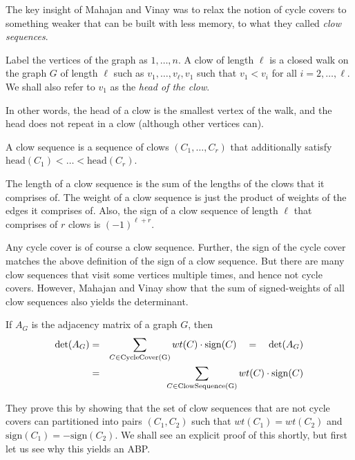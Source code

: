 The key insight of Mahajan and Vinay was to relax the notion of cycle covers to something weaker that can be built with less memory, to what they called \emph{clow sequences}. 

\begin{definition}
Label the vertices of the graph as $1,\dots, n$. A clow  of length $\ell$ is a closed walk on the graph $G$ of length $\ell$ such as $v_1,\dots, v_\ell,v_1$ such that $v_1 < v_i$ for all $i=2,\dots, \ell$. We shall also refer to $v_1$ as the \emph{head of the clow}. 

In other words, the head of a clow is the smallest vertex of the walk, and the head does not repeat in a clow (although other vertices can). 

A clow sequence is a sequence of clows $(C_1,\dots, C_r)$ that additionally satisfy $\mathrm{head}(C_1) < \dots < \mathrm{head}(C_r)$. 

The length of a clow sequence is the sum of the lengths of the clows that it comprises of. The weight of a clow sequence is just the product of weights of the edges it comprises of. Also, the sign of a clow sequence of length $\ell$ that comprises of $r$ clows is $(-1)^{\ell + r}$. 
\end{definition}

Any cycle cover is of course a clow sequence. Further, the sign of the cycle cover matches the above definition of the sign of a clow sequence. But there are many clow sequences that visit some vertices multiple times, and hence not cycle covers. However, Mahajan and Vinay show that the sum of signed-weights of all clow sequences also yields the determinant. 

\begin{lemma}[\cite{mv97}]\label{lem:mv-clowseq} If $A_G$ is the adjacency matrix of a graph $G$, then
\begin{eqnarray*}
\det(A_G) & = &  \sum_{C \in \mathrm{CycleCover(G)}} wt(C) \cdot \mathrm{sign}(C) \quad = \quad \det(A_G)\\
& = & \sum_{C \in \mathrm{ClowSequence(G)}} wt(C) \cdot \mathrm{sign}(C)
\end{eqnarray*}
\end{lemma}

They prove this by showing that the set of clow sequences that are not cycle covers can partitioned into pairs $(C_1,C_2)$ such that $wt(C_1) = wt(C_2)$ and $\mathrm{sign}(C_1) = - \mathrm{sign}(C_2)$. We shall see an explicit proof of this shortly, but first let us see why this yields an ABP. \\

